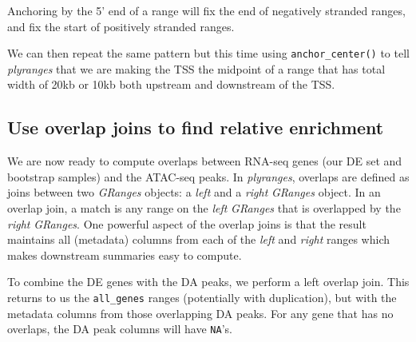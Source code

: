 \documentclass[
  9pt,
  a4paper,
]{extarticle}
\newenvironment{Shaded}{\begin{snugshade}}{\end{snugshade}}
\newcommand{\DataTypeTok}[1]{\textcolor[rgb]{0.13,0.29,0.53}{#1}}
\newcommand{\DecValTok}[1]{\textcolor[rgb]{0.00,0.00,0.81}{#1}}
\newcommand{\FloatTok}[1]{\textcolor[rgb]{0.00,0.00,0.81}{#1}}
\newcommand{\KeywordTok}[1]{\textcolor[rgb]{0.13,0.29,0.53}{\textbf{#1}}}
\newcommand{\NormalTok}[1]{#1}
\newcommand{\OperatorTok}[1]{\textcolor[rgb]{0.81,0.36,0.00}{\textbf{#1}}}
\newcommand{\StringTok}[1]{\textcolor[rgb]{0.31,0.60,0.02}{#1}}
\begin{document}
\begin{Shaded}
\end{Shaded}

Anchoring by the 5' end of a range will fix the end of negatively stranded
ranges, and fix the start of positively stranded ranges.

We can then repeat the same pattern but this time using \texttt{anchor\_center()} to
tell \emph{plyranges} that we are making the TSS the midpoint of a range that has
total width of 20kb or 10kb both upstream and downstream of the TSS.

\begin{Shaded}
\end{Shaded}

\hypertarget{use-overlap-joins-to-find-relative-enrichment}{%
\subsection{Use overlap joins to find relative enrichment}\label{use-overlap-joins-to-find-relative-enrichment}}

We are now ready to compute overlaps between RNA-seq genes (our DE set and
bootstrap samples) and the ATAC-seq peaks. In \emph{plyranges}, overlaps are defined
as joins between two \emph{GRanges} objects: a \emph{left} and a \emph{right} \emph{GRanges}
object. In an overlap join, a match is any range on the \emph{left} \emph{GRanges} that
is overlapped by the \emph{right} \emph{GRanges}. One powerful aspect of the overlap
joins is that the result maintains all (metadata) columns from each of the
\emph{left} and \emph{right} ranges which makes downstream summaries easy to compute.

To combine the DE genes with the DA peaks, we perform a left overlap join. This
returns to us the \texttt{all\_genes} ranges (potentially with duplication), but with
the metadata columns from those overlapping DA peaks. For any gene that has no
overlaps, the DA peak columns will have \texttt{NA}'s.
\end{document}
